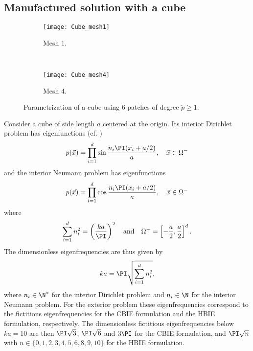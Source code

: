 \subsection{Manufactured solution with a cube}
\begin{figure}
	\centering
	\begin{subfigure}[t]{0.3\textwidth}
		\texttt{[image: Cube\_mesh1]}
		\caption{Mesh 1.}
		\label{Fig3:Cube_mesh1}
	\end{subfigure} 
	~
	\begin{subfigure}[t]{0.3\textwidth}
		\texttt{[image: Cube\_mesh4]}
		\caption{Mesh 4.}
		\label{Fig3:Cube_mesh4}
	\end{subfigure} 
	\caption{Parametrization of a cube using 6 patches of degree $\check{p}\geq 1$.}
	\label{Fig3:CubeParametrizations}
\end{figure}
Consider a cube of side length $a$ centered at the origin. Its interior Dirichlet problem has eigenfunctions (cf. \cite[p. 52]{Schenck1968iif})
\begin{equation*}
	p(\vec{x}) = \prod_{i=1}^d\sin\frac{n_i\PI (x_i+a/2)}{a},\quad \vec{x}\in\Omega^-
\end{equation*}
and the interior Neumann problem has eigenfunctions
\begin{equation*}
	p(\vec{x}) = \prod_{i=1}^d\cos\frac{n_i\PI (x_i+a/2)}{a},\quad \vec{x}\in\Omega^-
\end{equation*}
where
\begin{equation*}
	\sum_{i=1}^d n_i^2 = \left(\frac{ka}{\PI}\right)^2\quad\text{and}\quad\Omega^-=\left[-\frac{a}{2},\frac{a}{2}\right]^d.
\end{equation*}
The dimensionless eigenfrequencies are thus given by
\begin{equation*}
	ka=\PI\sqrt{\sum_{i=1}^d n_i^2},
\end{equation*}
where $n_i\in\N^*$ for the interior Dirichlet problem and $n_i\in\N$ for the interior Neumann problem. For the exterior problem these eigenfrequencies correspond to the fictitious eigenfrequencies for the CBIE formulation and the HBIE formulation, respectively. The dimensionless fictitious eigenfrequencies below $ka=10$ are then $\PI\sqrt{3}$, $\PI\sqrt{6}$ and $3\PI$ for the CBIE formulation, and $\PI\sqrt{n}$ with $n\in\{0,1,2,3,4,5,6,8,9,10\}$ for the HBIE formulation.

